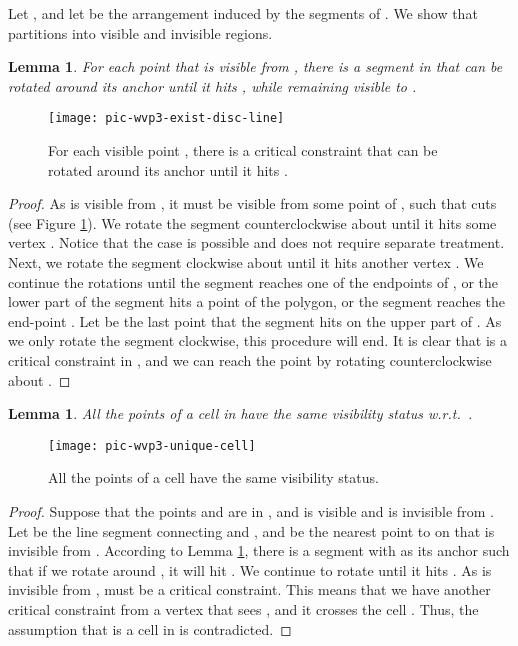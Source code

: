 \documentclass[5p]{elsarticle}
\newtheorem{lemma}[theorem]{Lemma}
\begin{document}
Let , and
let  be the arrangement induced by the segments of .
We show that  partitions  into visible and invisible 
regions.

\begin{lemma}
\label{lemma:e_exists}
For each point  that is visible from , there is 
a segment  in  that can be rotated around its anchor
until it hits , while remaining visible to .
\end{lemma}

\begin{figure}[h]
  \centering
  \texttt{[image: pic-wvp3-exist-disc-line]} 
  \caption{For each visible point , there is a  
  critical constraint  that can be rotated around its anchor  until it hits .}
  \label{fig:wvp3-exist-disc-line}
\end{figure}

\begin{proof}
As  is visible from , 
it must be visible from some point  of , such that  cuts 
(see Figure \ref{fig:wvp3-exist-disc-line}).
We rotate the segment  counterclockwise about  until
it hits some vertex . 
Notice that the case  is possible and does not require separate
treatment.
Next, we rotate the segment clockwise about  until it hits another vertex . 
We continue the rotations until the segment reaches one of the endpoints of , 
or the lower part of the segment hits a point  of the polygon,
or the segment reaches the end-point . 
Let  be the last point that the segment hits on the upper part of . 
As we only rotate the segment clockwise, this
procedure will end.
It is clear that
 is a critical constraint in , and we can reach the point  by rotating
 counterclockwise about . 
\end{proof}




\begin{lemma}
All the points of a cell  in  have the same
visibility status w.r.t.\ .
\end{lemma}

\begin{figure}[h]
  \centering
  \texttt{[image: pic-wvp3-unique-cell]} 
  \caption{All the points of a cell have the same visibility status.}
  \label{fig:wvp3-unique-cell}
\end{figure}


\begin{proof}
Suppose that the points  and  are in , and  is visible 
and  is invisible from . Let  be the line segment connecting
 and , and  be the nearest point to  on  that is invisible from .
According to Lemma \ref{lemma:e_exists}, there is a segment  with
 as its anchor such that if we rotate  around , it will hit . 
We continue to rotate  until it hits . As  is invisible from ,
 must be a critical constraint. This means that we have another critical constraint
from a vertex  that sees , and it crosses the cell . Thus,
the assumption that  is a cell in  is contradicted.
\end{proof}
\end{document}
